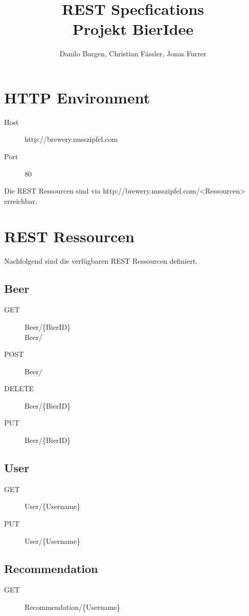 \documentclass[10pt,a4paper]{scrartcl}
\author{Danilo Bargen, Christian Fässler, Jonas Furrer}
\title{REST Specfications\\Projekt BierIdee}
\begin{document}
\begin{titlepage}
	\maketitle
	\vspace{120mm}
	\thispagestyle{empty} %
\end{titlepage}

\section{HTTP Environment}
\begin{description}
\item[Host] http://brewery.nusszipfel.com
\item[Port] 80

\end{description}
Die REST Ressourcen sind via http://brewery.nusszipfel.com/<Ressourcen> erreichbar.
\section{REST Ressourcen}
Nachfolgend sind die verfügbaren REST Ressourcen definiert.
\subsection{Beer}
\begin{description}
\item[GET] Beer/\{BierID\}
 \\Beer/
\item[POST] Beer/
\item[DELETE] Beer/\{BierID\}
\item[PUT] Beer/\{BierID\}
\end{description}

\subsection{User}
\begin{description}
\item[GET] User/\{Username\}
\item[PUT] User/\{Username\}
\end{description}

\subsection{Recommendation}
\begin{description}
\item[GET] Recommendation/\{Username\}
\end{description}
\end{document}
